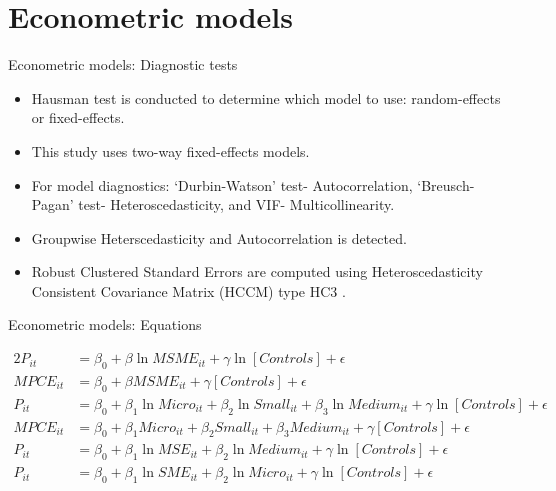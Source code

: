 \documentclass[10pt,aspectratio=169]{beamer}
\begin{document}
\section{Econometric models}

\begin{frame}{Econometric models: Diagnostic tests}

\fontsize{10pt}{12pt}
\begin{itemize}

\item Hausman test is conducted to determine which model to use: random-effects or fixed-effects.
\item This study uses two-way fixed-effects models.
\item For model diagnostics: `Durbin-Watson' test- Autocorrelation, `Breusch-Pagan' test- Heteroscedasticity, and VIF- Multicollinearity.
\item Groupwise Heterscedasticity and Autocorrelation is detected.
\item  Robust Clustered Standard Errors are computed using Heteroscedasticity Consistent Covariance Matrix (HCCM) type HC3 \parencite{380055f1-819e-3149-a01c-cfab4e53c79f}.

\end{itemize}
\end{frame}

\begin{frame}{Econometric models: Equations}

\setlength{\jot}{8pt}
\begin{alignat}{2}
    P_{it} &= \beta_0 + \beta\ln{MSME_{it}} + \gamma\ln[Controls] + \epsilon \\
    MPCE_{it} &= \beta_0 + \beta MSME_{it} + \gamma[Controls] + \epsilon \\
    P_{it} &= \beta_0 + \beta_1\ln{Micro}_{it} + \beta_2\ln{Small}_{it} + \beta_3\ln{Medium}_{it} + \gamma\ln[Controls] + \epsilon \\
    MPCE_{it} &=  \beta_0 + \beta_1{Micro}_{it} + \beta_2{Small}_{it} + \beta_3{Medium}_{it} + \gamma[Controls] + \epsilon \\
    P_{it} &= \beta_0 + \beta_1\ln{MSE}_{it} + \beta_2\ln{Medium}_{it} + \gamma\ln[Controls] + \epsilon \\
    P_{it} &= \beta_0 + \beta_1\ln{SME}_{it} + \beta_2\ln{Micro}_{it} + \gamma\ln[Controls] + \epsilon 
\end{alignat}


\end{frame}
\end{document}
